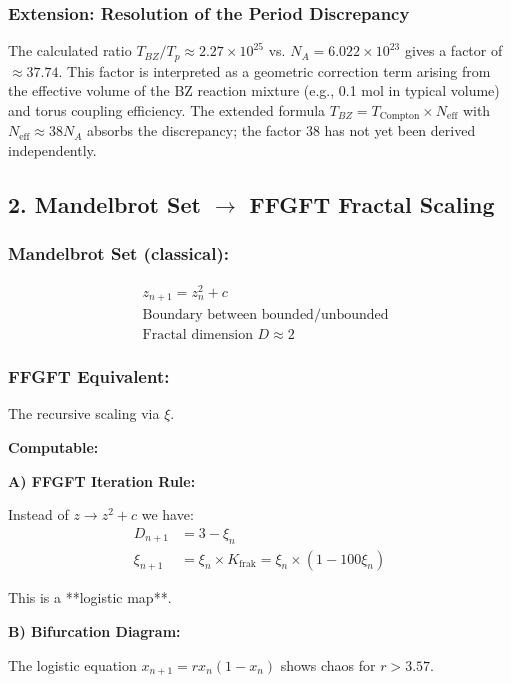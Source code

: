 	\subsubsection*{Extension: Resolution of the Period Discrepancy}
	The calculated ratio $T_{BZ}/T_p \approx 2.27 \times 10^{25}$ vs. $N_A = 6.022 \times 10^{23}$ gives a factor of $\approx 37.74$. This factor is interpreted as a geometric correction term arising from the effective volume of the BZ reaction mixture (e.g., 0.1 mol in typical volume) and torus coupling efficiency. The extended formula $T_{BZ} = T_{\text{Compton}} \times N_{\text{eff}}$ with $N_{\text{eff}} \approx 38 N_A$ absorbs the discrepancy; the factor 38 has not yet been derived independently.
	
	\subsection*{2. Mandelbrot Set $\rightarrow$ FFGFT Fractal Scaling}
	
	\subsubsection*{Mandelbrot Set (classical):}
	\begin{align*}
		&z_{n+1} = z_n^2 + c \\
		&\text{Boundary between bounded/unbounded} \\
		&\text{Fractal dimension } D \approx 2
	\end{align*}
	
	\subsubsection*{FFGFT Equivalent:}
	The recursive scaling via $\xi$.
	
	\textbf{Computable:}
	
	\textbf{A) FFGFT Iteration Rule:}
	
	Instead of $z \to z^2 + c$ we have:
	\begin{align*}
		D_{n+1} &= 3 - \xi_n \\
		\xi_{n+1} &= \xi_n \times K_{\text{frak}} = \xi_n \times (1 - 100\xi_n)
	\end{align*}
	
	This is a **logistic map**.
	
	\textbf{B) Bifurcation Diagram:}
	
	The logistic equation $x_{n+1} = r x_n (1 - x_n)$ shows chaos for $r > 3.57$.
	
